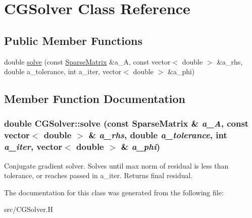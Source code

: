 \hypertarget{classCGSolver}{
\section{CGSolver Class Reference}
\label{classCGSolver}
}
\subsection*{Public Member Functions}
\begin{DoxyCompactItemize}
\item 
double \hyperlink{classCGSolver_aa0b350f66c802b469491670e4648786a}{solve} (const \hyperlink{classSparseMatrix}{SparseMatrix} \&a\_\-A, const vector$<$ double $>$ \&a\_\-rhs, double a\_\-tolerance, int a\_\-iter, vector$<$ double $>$ \&a\_\-phi)
\end{DoxyCompactItemize}


\subsection{Member Function Documentation}
\hypertarget{classCGSolver_aa0b350f66c802b469491670e4648786a}{
\subsubsection[{solve}]{\setlength{\rightskip}{0pt plus 5cm}double CGSolver::solve (const {\bf SparseMatrix} \& {\em a\_\-A}, \/  const vector$<$ double $>$ \& {\em a\_\-rhs}, \/  double {\em a\_\-tolerance}, \/  int {\em a\_\-iter}, \/  vector$<$ double $>$ \& {\em a\_\-phi})}}
\label{classCGSolver_aa0b350f66c802b469491670e4648786a}
Conjugate gradient solver. Solves until max norm of residual is less than tolerance, or reaches passed in a\_\-iter. Returns final residual. 

The documentation for this class was generated from the following file:\begin{DoxyCompactItemize}
\item 
src/CGSolver.H\end{DoxyCompactItemize}

